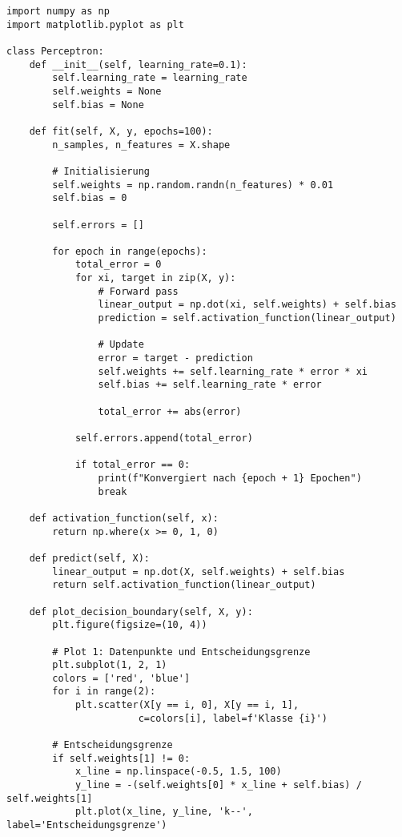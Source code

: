 \documentclass[12pt,a4paper]{article}
\begin{document}
\begin{lstlisting}[caption=Perceptron-Implementierung]
import numpy as np
import matplotlib.pyplot as plt

class Perceptron:
    def __init__(self, learning_rate=0.1):
        self.learning_rate = learning_rate
        self.weights = None
        self.bias = None
        
    def fit(self, X, y, epochs=100):
        n_samples, n_features = X.shape
        
        # Initialisierung
        self.weights = np.random.randn(n_features) * 0.01
        self.bias = 0
        
        self.errors = []
        
        for epoch in range(epochs):
            total_error = 0
            for xi, target in zip(X, y):
                # Forward pass
                linear_output = np.dot(xi, self.weights) + self.bias
                prediction = self.activation_function(linear_output)
                
                # Update
                error = target - prediction
                self.weights += self.learning_rate * error * xi
                self.bias += self.learning_rate * error
                
                total_error += abs(error)
            
            self.errors.append(total_error)
            
            if total_error == 0:
                print(f"Konvergiert nach {epoch + 1} Epochen")
                break
    
    def activation_function(self, x):
        return np.where(x >= 0, 1, 0)
    
    def predict(self, X):
        linear_output = np.dot(X, self.weights) + self.bias
        return self.activation_function(linear_output)
    
    def plot_decision_boundary(self, X, y):
        plt.figure(figsize=(10, 4))
        
        # Plot 1: Datenpunkte und Entscheidungsgrenze
        plt.subplot(1, 2, 1)
        colors = ['red', 'blue']
        for i in range(2):
            plt.scatter(X[y == i, 0], X[y == i, 1], 
                       c=colors[i], label=f'Klasse {i}')
        
        # Entscheidungsgrenze
        if self.weights[1] != 0:
            x_line = np.linspace(-0.5, 1.5, 100)
            y_line = -(self.weights[0] * x_line + self.bias) / self.weights[1]
            plt.plot(x_line, y_line, 'k--', label='Entscheidungsgrenze')
        

\end{lstlisting}
\end{document}
